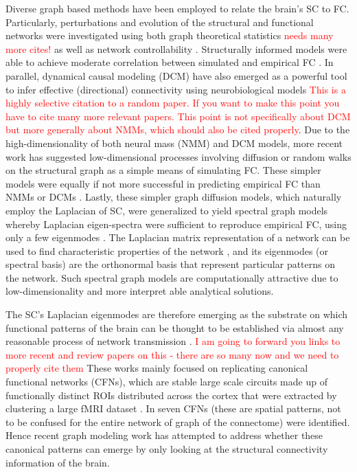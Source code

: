 \documentclass{article}
\begin{document}
Diverse graph based methods have been employed to relate the brain's SC to FC. Particularly, perturbations and evolution of the structural and functional networks were investigated using both graph theoretical statistics \cite{Honey2009, Kuceyeski2016} \textcolor{red}{needs many more cites!} as well as network controllability \cite{gu_controllability_2015, Muldoon2016}. Structurally informed models were able to achieve moderate correlation between simulated and empirical FC \cite{Honey2009}. In parallel, dynamical causal modeling (DCM) have also emerged as a powerful tool to infer effective (directional) connectivity using neurobiological models \cite{frassle_generative_2018} \textcolor{red}{This is a highly selective citation to a random paper. If you want to make this point you have to cite many more relevant papers. This point is not specifically about DCM but more generally about NMMs, which should also be cited properly}. Due to the high-dimensionality of both neural mass (NMM) and DCM models, more recent work has suggested low-dimensional processes involving diffusion or random walks on the structural graph as a simple means of simulating FC. These simpler models were equally if not more successful in predicting empirical FC than NMMs or DCMs \cite{Abdelnour2014}.  Lastly, these simpler graph diffusion models, which naturally employ the Laplacian of SC, were generalized to yield spectral graph models whereby Laplacian eigen-spectra were sufficient to reproduce empirical FC, using only a few eigenmodes \cite{Abdelnour2018, Atasoy2016}. The Laplacian matrix representation of a network can be used to find characteristic properties of the network \cite{Stewart1999}, and its eigenmodes (or spectral basis) are the orthonormal basis that represent particular patterns on the network. Such spectral graph models are computationally attractive due to low-dimensionality and more interpret able analytical solutions.

The SC's Laplacian eigenmodes are therefore emerging as the substrate on which functional patterns of the brain can be thought to be established via almost any reasonable process of network transmission \cite{Abdelnour2018, Atasoy2016, preti_decoupling_2019}. \textcolor{red}{I am going to forward you links to more recent and review papers on this - there are so many now and we need to properly cite them} These works mainly focused on replicating canonical functional networks (CFNs), which are stable large scale circuits made up of functionally distinct ROIs distributed across the cortex that were extracted by clustering a large fMRI dataset \cite{Yeo2011}. In \cite{Yeo2011} seven CFNs (these are spatial patterns, not to be confused for the entire network of graph of the connectome) were identified. Hence recent graph modeling work has attempted to address whether these canonical patterns can emerge by only looking at the structural connectivity information of the brain.
\end{document}
